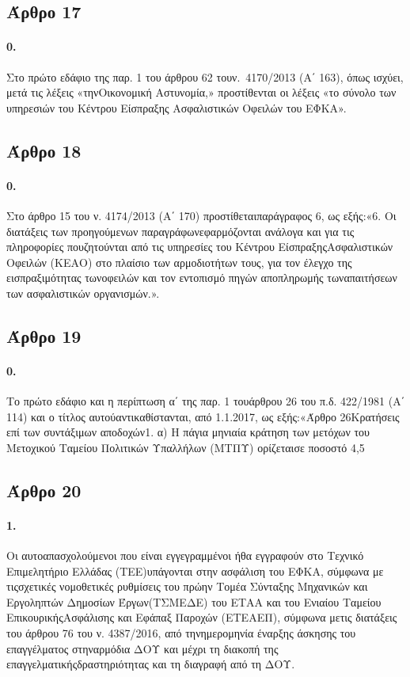 \documentclass[a4paper,oneside, 10pt]{book}
\begin{document}
\subsection*{ Άρθρο 17 }
\paragraph { 0. } Στο πρώτο εδάφιο της παρ. 1 του άρθρου 62 τουν. 4170/2013 (Α΄ 163), όπως ισχύει, μετά τις λέξεις «τηνΟικονομική Αστυνομία,» προστίθενται οι λέξεις «το σύνολο των υπηρεσιών του Κέντρου Είσπραξης Ασφαλιστικών Οφειλών του ΕΦΚΑ».
\subsection*{ Άρθρο 18 }
\paragraph { 0. } Στο άρθρο 15 του ν. 4174/2013 (Α΄ 170) προστίθεταιπαράγραφος 6, ως εξής:«6. Οι διατάξεις των προηγούμενων παραγράφωνεφαρμόζονται ανάλογα και για τις πληροφορίες πουζητούνται από τις υπηρεσίες του Κέντρου ΕίσπραξηςΑσφαλιστικών Οφειλών (ΚΕΑΟ) στο πλαίσιο των αρμοδιοτήτων τους, για τον έλεγχο της εισπραξιμότητας τωνοφειλών και τον εντοπισμό πηγών αποπληρωμής τωναπαιτήσεων των ασφαλιστικών οργανισμών.».
\subsection*{ Άρθρο 19 }
\paragraph { 0. } Το πρώτο εδάφιο και η περίπτωση α΄ της παρ. 1 τουάρθρου 26 του π.δ. 422/1981 (Α΄ 114) και ο τίτλος αυτούαντικαθίστανται, από 1.1.2017, ως εξής:«Άρθρο 26Κρατήσεις επί των συντάξιμων αποδοχών1. α) Η πάγια μηνιαία κράτηση των μετόχων του Μετοχικού Ταμείου Πολιτικών Υπαλλήλων (MTΠΥ) ορίζεταισε ποσοστό 4,5%
\subsection*{ Άρθρο 20 }
\paragraph { 1. } Οι αυτοαπασχολούμενοι που είναι εγγεγραμμένοι ήθα εγγραφούν στο Τεχνικό Επιμελητήριο Ελλάδας (ΤΕΕ)υπάγονται στην ασφάλιση του ΕΦΚΑ, σύμφωνα με τιςσχετικές νομοθετικές ρυθμίσεις του πρώην Τομέα Σύνταξης Μηχανικών και Εργοληπτών Δημοσίων Έργων(ΤΣΜΕΔΕ) του ΕΤΑΑ και του Ενιαίου Ταμείου ΕπικουρικήςΑσφάλισης και Εφάπαξ Παροχών (ΕΤΕΑΕΠ), σύμφωνα μετις διατάξεις του άρθρου 76 του ν. 4387/2016, από τηνημερομηνία έναρξης άσκησης του επαγγέλματος στηναρμόδια ΔΟΥ και μέχρι τη διακοπή της επαγγελματικήςδραστηριότητας και τη διαγραφή από τη ΔΟΥ.
\end{document}
